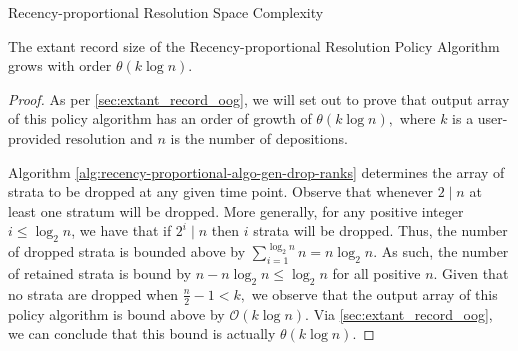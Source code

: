 \begin{theorem}{Recency-proportional Resolution Space Complexity}
\label{thm:recency-proportional-resolution-algo-space-complexity}

The \gls{extant record size} of the Recency-proportional Resolution Policy Algorithm grows with order $\mathcal{\theta}{(k \log n)}.$

\end{theorem}

\begin{proof}
\label{prf:recency-proportional-resolution-algo-space-complexity}
As per \ref{sec:extant_record_oog}, we will set out to prove that output array of this policy algorithm has an order of growth of $\mathcal{\theta}{(k \log n)},$ where $k$ is a user-provided resolution and $n$ is the number of depositions.

Algorithm \ref{alg:recency-proportional-algo-gen-drop-ranks} determines the array of strata to be dropped at any given time point.
Observe that whenever $2 \mid n$ at least one stratum will be dropped.
More generally, for any positive integer $i \le \log_2 n$, we have that if $2^i \mid n$ then $i$ strata will be dropped. 
Thus, the number of dropped strata is bounded above by $\sum_{i=1}^{\log_2 n} n = n \log_2 n.$
As such, the number of retained strata is bound by $n - n \log_2 n \le \log_2 n$ for all positive $n.$
Given that no strata are dropped when $\frac{n}{2} - 1 < k,$ we observe that the output array of this policy algorithm is bound above by $\mathcal{O}{(k \log n)}.$
Via \ref{sec:extant_record_oog}, we can conclude that this bound is actually $\mathcal{\theta}{(k \log n)}.$
\end{proof}

